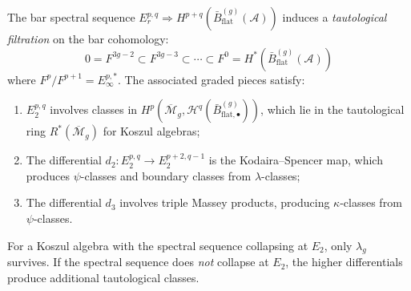 \begin{proposition}\label{prop:bar-tautological-filtration}
The bar spectral sequence
$E_r^{p,q} \Rightarrow
H^{p+q}(\bar{B}^{(g)}_{\mathrm{flat}}(\mathcal{A}))$
induces a \emph{tautological filtration} on the bar cohomology:
\begin{equation}\label{eq:tauto-filtration}
0 = F^{3g-2} \subset F^{3g-3} \subset \cdots \subset F^0 =
H^*(\bar{B}^{(g)}_{\mathrm{flat}}(\mathcal{A}))
\end{equation}
where $F^p / F^{p+1} = E_\infty^{p,*}$. The associated graded
pieces satisfy:
\begin{enumerate}[label=\textup{(\roman*)}]
\item $E_2^{p,q}$ involves classes in
 $H^p(\overline{\mathcal{M}}_g,
 \mathcal{H}^q(\bar{B}^{(g)}_{\mathrm{flat},\bullet}))$,
 which lie in the tautological ring $R^*(\overline{\mathcal{M}}_g)$
 for Koszul algebras;
\item The differential $d_2\colon E_2^{p,q} \to E_2^{p+2,q-1}$
 is the Kodaira--Spencer map, which produces $\psi$-classes and
 boundary classes from $\lambda$-classes;
\item The differential $d_3$ involves triple Massey products,
 producing $\kappa$-classes from $\psi$-classes.
\end{enumerate}
For a Koszul algebra with the spectral sequence collapsing at
$E_2$, only $\lambda_g$ survives. If the spectral sequence does
\emph{not} collapse at $E_2$, the higher differentials produce
additional tautological classes.
\end{proposition}

